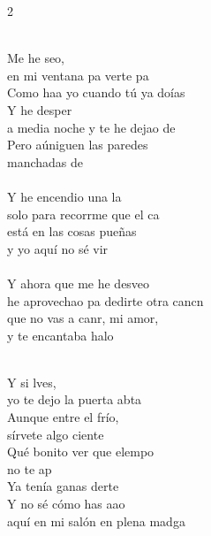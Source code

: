 \documentclass[11pt]{article}
\begin{document}
\sffamily

\begin{multicols*}{2}
\begin{cancion}[Desvelao][Serko]%
	    \\
	Me he seo, \\
	en mi ventana pa verte pa\\
	Como haa yo cuando tú ya doías \\
	Y he desper\\
	a media noche y te he dejao de \\
	Pero aúniguen las paredes \\
	manchadas de \\
\jump\\
	Y he encendio una la \\
	solo para recorrme que el ca\\
	está en las cosas pueñas \\
	y yo aquí no sé vir \\
\jump\\
	Y ahora que me he desveo \\
	he aprovechao pa dedirte otra cancn\\
	que no vas a canr, mi amor,\\
	y te encantaba halo\\\jump\\
	\begin{chorus}%
	Y si lves, \\
	yo te dejo la puerta abta\\
Aunque entre el frío, \\
	sírvete algo ciente\\
	Qué bonito ver que elempo \\
	no te ap \\
	Ya tenía ganas derte\\
	Y no sé cómo has aao \\
	aquí en mi salón en plena madga\\

\end{chorus}
\end{cancion}
\end{multicols*}
\end{document}
